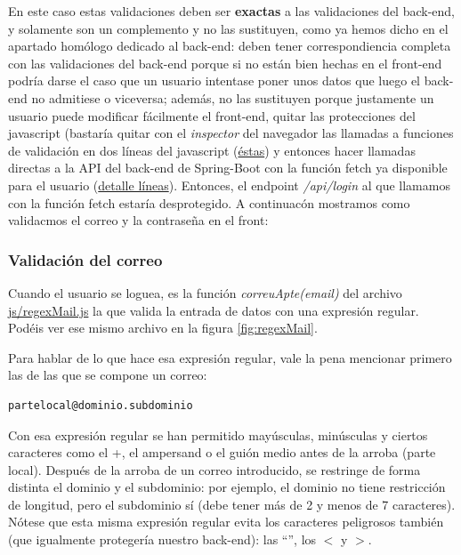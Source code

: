 \documentclass[a4paper,12pt]{report}
\begin{document}
	En este caso estas validaciones deben ser \textbf{exactas} a las validaciones del back-end, y solamente son un complemento y no las sustituyen, como ya hemos dicho en el apartado homólogo dedicado al back-end: deben tener correspondiencia completa con las validaciones del back-end porque si no están bien hechas en el front-end podría darse el caso que un usuario intentase poner unos datos que luego el back-end no admitiese o viceversa; además, no las sustituyen porque justamente un usuario puede modificar fácilmente el front-end, quitar las protecciones del javascript (bastaría quitar con el \textit{inspector} del navegador las llamadas a funciones de validación en dos líneas del javascript (\href{https://github.com/blackcub3s/mercApp/blob/d848aa27c1e460dc54bb665e9091d83e4b614531/APP%20WEB/__frontend__produccio__/app/pas2C_login.html#L31-L32}{éstas}) y entonces hacer llamadas directas a la API del back-end de Spring-Boot con la función fetch ya disponible para el usuario (\href{https://github.com/blackcub3s/mercApp/blob/d848aa27c1e460dc54bb665e9091d83e4b614531/APP%20WEB/__frontend__produccio__/app/pas2C_login.html#L36C31-L36C63}{detalle líneas}). Entonces, el endpoint \textit{/api/login} al que llamamos con la función fetch estaría desprotegido. A continuacón mostramos como validacmos el correo y la contraseña en el front:
	
		\subsubsection{Validación del correo}
	
		Cuando el usuario se loguea, es la función \textit{correuApte(email)} del archivo \href{https://github.com/blackcub3s/mercApp/blob/d848aa27c1e460dc54bb665e9091d83e4b614531/APP%20WEB/__frontend__produccio__/app/js/regexMail.js}{js/regexMail.js} la que valida la entrada de datos con una expresión regular. Podéis ver ese mismo archivo en la figura \ref{fig:regexMail}. 
		
		Para hablar de lo que hace esa expresión regular, vale la pena mencionar primero las de las que se compone un correo:
		
		\begin{lstlisting}[language=xml, basicstyle=\ttfamily\small]
		partelocal@dominio.subdominio
		\end{lstlisting}
		

		
		Con esa expresión regular se han permitido mayúsculas, minúsculas y ciertos caracteres como el +, el ampersand o el guión medio antes de la arroba (parte local). Después de la arroba de un correo introducido, se restringe de forma distinta el dominio y el subdominio: por ejemplo, el dominio no tiene restricción de longitud, pero el subdominio sí (debe tener más de 2 y menos de 7 caracteres). Nótese que esta misma expresión regular evita los caracteres peligrosos también (que igualmente protegería nuestro back-end): las ``'', los $<$ y $>$.
		
\end{document}
